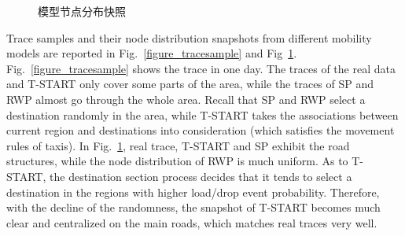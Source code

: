 \begin{figure}[h]
\centering
{}
\caption{模型节点分布快照}\label{figure_trace_snapshots}
\end{figure}

Trace samples and their node distribution snapshots from different mobility models are reported in Fig.~\ref{figure_tracesample} and Fig~\ref{figure_trace_snapshots}. Fig.~\ref{figure_tracesample} shows the trace in one day. The traces of the real data and T-START only cover some parts of the area, while the traces of SP and RWP almost go through the whole area. Recall that SP and RWP select a destination randomly in the area, while T-START takes the associations between current region and destinations into consideration (which satisfies the movement rules of taxis). In Fig.~\ref{figure_trace_snapshots}, real trace, T-START and SP exhibit the road structures, while the node distribution of RWP is much uniform. As to T-START, the destination section process decides that it tends to select a destination in the regions with higher load/drop event probability. Therefore, with the decline of the randomness, the snapshot of T-START becomes much clear and centralized on the main roads, which matches real traces very well.


